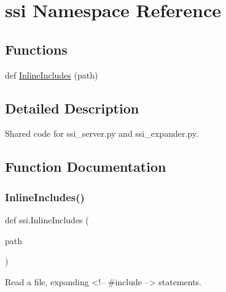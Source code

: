 \hypertarget{namespacessi}{}\section{ssi Namespace Reference}
\label{namespacessi}
\subsection*{Functions}
\begin{DoxyCompactItemize}
\item 
def \hyperlink{namespacessi_ab07da317277f45848f86e8fcbd78b7aa}{Inline\+Includes} (path)
\end{DoxyCompactItemize}


\subsection{Detailed Description}
\begin{DoxyVerb}Shared code for ssi_server.py and ssi_expander.py.
\end{DoxyVerb}
 

\subsection{Function Documentation}
\mbox{\label{namespacessi_ab07da317277f45848f86e8fcbd78b7aa}} 
\subsubsection{\texorpdfstring{Inline\+Includes()}{InlineIncludes()}}
{\footnotesize\ttfamily def ssi.\+Inline\+Includes (\begin{DoxyParamCaption}\item[{}]{path }\end{DoxyParamCaption})}

\begin{DoxyVerb}Read a file, expanding <!-- #include --> statements.\end{DoxyVerb}
 
